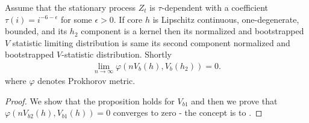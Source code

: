 \begin{lemma}
\label{lem:equivBoot}
Assume that the stationary process $Z_t$ is $\tau$-dependent with a coefficient $\tau(i) = i^{-6-\epsilon}$ for some $\epsilon>0$. If core $h$ is Lipschitz continuous, one-degenerate, bounded, and its $h_2$ component is a kernel then its normalized and bootstrapped $V$ statistic limiting distribution is same its second component normalized and bootstrapped $V$-statistic distribution. Shortly
\begin{align}
\lim_{n \to \infty} \varphi( n V_b(h), V_b(h_2)) =0. 
\end{align}
where $\varphi$ denotes Prokhorov metric. 
\end{lemma}
\begin{proof}
We show that the proposition holds for $V_{b1}$ and then we prove that $\varphi( n V_{b2}(h), V_{b1}(h)) =0$ converges to zero - the concept is to \cite{leucht_dependent_2013}.   


\end{proof}
